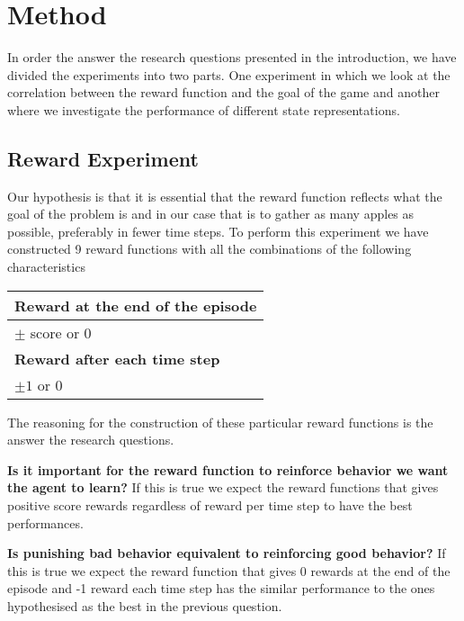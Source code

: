 \documentclass[report.tex]{subfiles}
\begin{document}
    \section*{\centering Method}

    In order the answer the research questions presented in the introduction, we have divided the experiments into two parts. One experiment in which we look at the correlation between the reward function and the goal of the game and another where we investigate the performance of different state representations.

    \subsection*{Reward Experiment}

    Our hypothesis is that it is essential that the reward function reflects what the goal of the problem is and in our case that is to gather as many apples as possible, preferably in fewer time steps. To perform this experiment we have constructed 9 reward functions with all the combinations of the following characteristics

    \begin{center}
        \begin{tabular}{| l |}
            \hline
            \textbf{Reward at the end of the episode} \\ \hline
            $\pm$ score or 0 \\ \hline
            \textbf{Reward after each time step} \\ \hline
            $\pm 1$ or 0 \\ \hline
        \end{tabular}
    \end{center}

    The reasoning for the construction of these particular reward functions is the answer the research questions.

    \textbf{Is it important for the reward function to reinforce behavior we want the agent to learn?} If this is true we expect the reward functions that gives positive score rewards regardless of reward per time step to have the best performances.

    \textbf{Is punishing bad behavior equivalent to reinforcing good behavior?} If this is true we expect the reward function that gives 0 rewards at the end of the episode and -1 reward each time step has the similar performance to the ones hypothesised as the best in the previous question.
\end{document}

